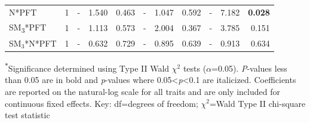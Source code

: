 \begin{landscape}
\begin{table}
{\begin{tabular}{p{3.75cm}p{0.5cm}p{1.75cm}p{1.5cm}p{1.5cm}p{1.75cm}p{1.5cm}p{1.5cm}p{1.75cm}p{1.5cm}p{1.5cm}}
            N*PFT & \multicolumn{1}{r}{1}
            & \multicolumn{1}{r}{-}             & \multicolumn{1}{r}{1.540}         & \multicolumn{1}{r}{0.463}
            & \multicolumn{1}{r}{-}             & \multicolumn{1}{r}{1.047}         & \multicolumn{1}{r}{0.592}
            & \multicolumn{1}{r}{-}             & \multicolumn{1}{r}{7.182}         & \multicolumn{1}{r}{\textbf{0.028}}
            \\ %

            SM\textsubscript{3}*PFT & \multicolumn{1}{r}{1}
            & \multicolumn{1}{r}{-}             & \multicolumn{1}{r}{1.113}         & \multicolumn{1}{r}{0.573}
            & \multicolumn{1}{r}{-}             & \multicolumn{1}{r}{2.004}         & \multicolumn{1}{r}{0.367}
            & \multicolumn{1}{r}{-}             & \multicolumn{1}{r}{3.785}         & \multicolumn{1}{r}{0.151} 
            \\

            SM$_{3}$*N*PFT & \multicolumn{1}{r}{1}
            & \multicolumn{1}{r}{-}             & \multicolumn{1}{r}{0.632}         & \multicolumn{1}{r}{0.729}
            & \multicolumn{1}{r}{-}             & \multicolumn{1}{r}{0.895}         & \multicolumn{1}{r}{0.639}
            & \multicolumn{1}{r}{-}             & \multicolumn{1}{r}{0.913}         & \multicolumn{1}{r}{0.634}
            \\
            \hline

    \end{tabular}}
    \label{tab:table4.4}
\end{table}
\begin{singlespace}
    \noindent \textsuperscript{$*$}Significance determined using Type II Wald $\chi^{2}$ tests ($\alpha$=0.05). \textit{P}-values less than 0.05 are in bold and \textit{p}-values where 0.05<\textit{p}<0.1 are italicized. Coefficients are reported on the natural-log scale for all traits and are only included for continuous fixed effects. Key: df=degrees of freedom; $\chi^2$=Wald Type II chi-square test statistic
\end{singlespace}
\end{landscape}
\clearpage


